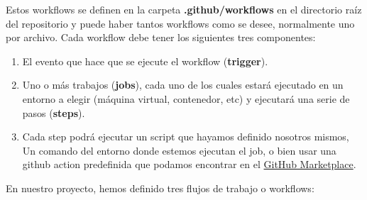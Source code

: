 Estos workflows se definen en la carpeta \textbf{.github/workflows} en el directorio raíz
del repositorio y puede haber tantos workflows como se desee, normalmente uno por archivo.
Cada workflow debe tener los siguientes tres componentes:

    \begin{enumerate}
        \item El evento que hace que se ejecute el workflow (\textbf{trigger}).
        \item Uno o más trabajos (\textbf{jobs}), cada uno de los cuales estará ejecutado en
        un entorno a elegir (máquina virtual, contenedor, etc) y ejecutará una serie de
        pasos (\textbf{steps}).
        \item Cada step podrá ejecutar un script que hayamos definido nosotros mismos, Un
        comando del entorno donde estemos ejecutan el job, o bien usar una github action
        predefinida que podamos encontrar en el
        \href{https://github.com/marketplace?type=actions}{GitHub Marketplace}.
    \end{enumerate}

En nuestro proyecto, hemos definido tres flujos de trabajo o workflows:


